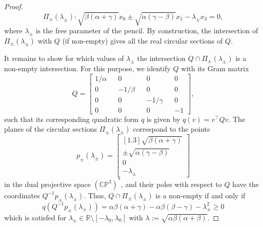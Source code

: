\documentclass[10pt, a4paper]{article}
\theoremstyle{BoldTopSpacing}
\theoremstyle{BoldTopSpacing}
\theoremstyle{BoldTopSpacing}
\theoremstyle{BoldTopBottomSpacing}
\theoremstyle{BoldTopSpacing}
\theoremstyle{BoldTopBottomSpacing}
\theoremstyle{remark}
\begin{document}
\begin{proof}
\[
    \Pi_{\pm}(\lambda_{\pm}) : \sqrt{\beta (\alpha + \gamma)} x_{0} \pm \sqrt{\alpha (\gamma - \beta)} x_{1} - \lambda_{\pm} x_{3} = 0,
\]
where $\lambda_{\pm}$ is the free parameter of the pencil. By construction, the intersection of $\Pi_{\pm}(\lambda_{\pm})$ with $Q$ (if non-empty) gives all the real circular sections of $Q$. \par
It remains to show for which values of $\lambda_{\pm}$ the intersection $Q \cap \Pi_{\pm}(\lambda_{\pm})$ is a non-empty intersection. For this purpose, we identify $Q$ with its Gram matrix
\[
Q =
\begin{bmatrix}
1 / \alpha && 0 && 0 && 0 \\
0 && -1 / \beta && 0 && 0 \\
0 && 0 && -1 / \gamma && 0 \\
0 && 0 && 0 && -1
\end{bmatrix},
\]
such that its corresponding quadratic form $q$ is given by $q(v) = v^{\top} Q v$. The planes of the circular sections $\Pi_{\pm}(\lambda_{\pm})$ correspond to the points
\[
p_{\pm}({\lambda_{\pm}}) =
\begin{bmatrix}[1.3]
\sqrt{\beta (\alpha + \gamma)}\\
\pm \sqrt{\alpha (\gamma - \beta)}\\
0\\
-\lambda_{\pm}
\end{bmatrix}
\]
in the dual projective space $(\mathbb{C}\mathbb{P}^3)^{*}$, and their poles with respect to $Q$ have the coordinates $Q^{-1}p_{\pm}({\lambda_{\pm}})$. Thus, $Q \cap \Pi_{\pm}(\lambda_{\pm})$ is a non-empty if and only if
\[
    q(Q^{-1}p_{\pm}({\lambda_{\pm}})) = \alpha \beta (\alpha + \gamma) - \alpha \beta (\beta - \gamma) - \lambda_{\pm}^2 \geq 0
\]
which is satisfed for $\lambda_{\pm} \in \mathbb{R} \setminus \left[-\lambda_0, \lambda_0\right]$ with $\lambda := \sqrt{\alpha \beta (\alpha+\beta)}$.
\end{proof}
\end{document}
